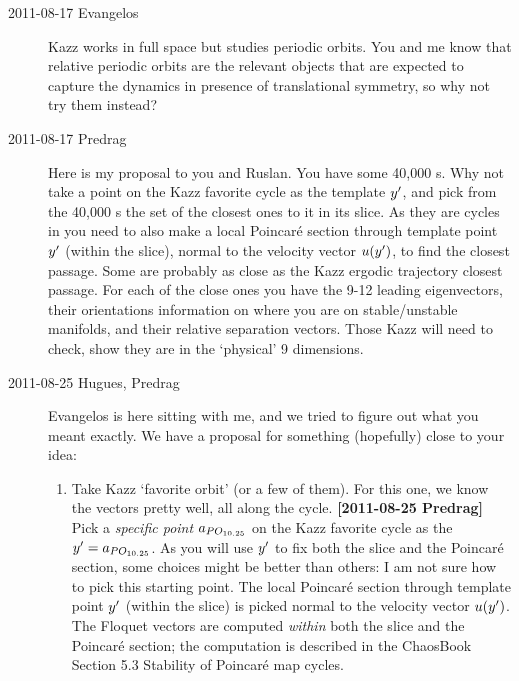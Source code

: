 \begin{description}
\item[2011-08-17 Evangelos]
Kazz works in full space but studies
periodic orbits. You and me know that relative periodic orbits are the
relevant objects that are expected to capture the dynamics in presence
of translational symmetry, so why not try them instead?

\item[2011-08-17 Predrag]
Here is my proposal to you and Ruslan. You have some 40,000 \rpo s. Why
not take a point on the Kazz favorite cycle
 as the template ${y'}$, and pick from
the 40,000 \rpo s the set of the closest ones to it in its slice. As they
are cycles in {\pSRed} you need to also make a local Poincar\'e section
through template point ${y'}$ (within the slice), normal to the
velocity vector $u({y'})$, to find the closest passage. Some are
probably as close as the Kazz ergodic trajectory closest passage. For
each of the close ones you have the 9-12 leading eigenvectors, their
orientations information on where you are on stable/unstable manifolds,
and their relative separation vectors. Those Kazz will need to check,
show they are in the `physical' 9 dimensions.

\item[2011-08-25 Hugues, Predrag]
Evangelos is here sitting with me, and we tried to figure out what you
meant exactly. We have a proposal for something (hopefully) close to your
idea:
\begin{enumerate}
  \item Take Kazz `favorite orbit'  (or a few of them). For
  this one, we know the vectors pretty well, all along the cycle.
    {\bf [2011-08-25 Predrag]} Pick a \emph{specific point}
    $a_{PO_{10.25}}$ on the Kazz favorite cycle  as the
    \template\ ${y'} = a_{PO_{10.25}}$. As you will use ${y'}$
    to fix both the slice and the Poincar\'e section, some choices might
    be better than others: I am not sure how to pick this starting point.
    The local Poincar\'e section through template point ${y'}$ (within
    the slice) is picked normal to the velocity vector
    $u({y'})$. The Floquet vectors are computed \emph{within}
    both the slice and the Poincar\'e section; the computation is
    described in the ChaosBook Section 5.3
     {Stability of
    Poincar\'e map cycles}.



\end{enumerate}
\end{description}
